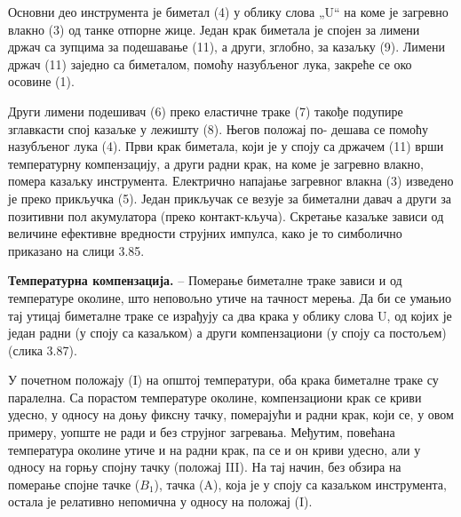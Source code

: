 \documentclass[12pt,a4paper]{report}
\begin{document}
Основни део инструмента је биметал (4) у облику слова „U“ на коме је загревно влакно (3) од танке отпорне жице. Један крак биметала је спојен за лимени држач са зупцима за подешавање (11), а други, зглобно, за казаљку (9). Лимени држач (11) заједно са биметалом, помоћу назубљеног лука, закреће се око осовине (1).

Други лимени подешивач (6) преко еластичне траке (7) такође подупире зглавкасти спој казаљке у лежишту (8). Његов положај по-%
дешава се помоћу назубљеног лука (4). Први крак биметала, који је у споју са држачем (11) врши температурну компензацију, а други радни крак, на коме је загревно влакно, помера казаљку инструмента. Електрично напајање загревног влакна (3) изведено је преко прикључка (5). Један прикључак се везује за биметални давач а други за позитивни пол акумулатора (преко контакт-кључа). Скретање казаљке зависи од величине ефективне вредности струјних импулса, како је то симболично приказано на слици 3.85.

\textbf{Температурна компензација.} – Померање биметалне траке зависи и од температуре околине, што неповољно утиче на тачност мерења. Да би се умањио тај утицај биметалне траке се израђују са два крака у облику слова U, од којих је један радни (у споју са казаљком) а други компензациони (у споју са постољем) (слика 3.87).


У почетном положају (I) на општој температури, оба крака биметалне траке су паралелна. Са порастом температуре околине, компензациони крак се криви удесно, у односу на доњу фиксну тачку, померајући и радни крак, који се, у овом примеру, уопште не ради и без струјног загревања. Међутим, повећана температура околине утиче и на радни крак, па се и он криви удесно, али у односу на горњу спојну тачку (положај III). На тај начин, без обзира на померање спојне тачке ($B_1$), тачка (A), која је у споју са казаљком инструмента, остала је релативно непомична у односу на положај (I).
\end{document}
